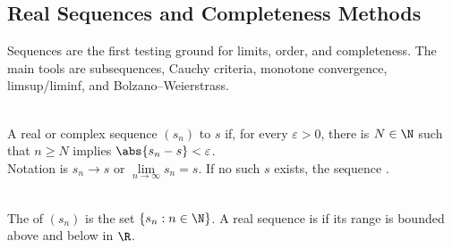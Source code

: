 \subsection{Real Sequences and Completeness Methods}

%

Sequences are the first testing ground for limits, order, and completeness. The main tools are subsequences, Cauchy criteria, monotone convergence, limsup/liminf, and Bolzano--Weierstrass.

\begin{definition} \label{def:real-complex-sequence-convergence} \\
A real or complex sequence $(s_n)$  to $s$ if, for every $\varepsilon>0$, there is $N\in\N$ such that $n\geq N$ implies $\abs{s_n-s}<\varepsilon$.\\
Notation is $s_n\to s$ or $\lim\limits_{n\to\infty}s_n=s$. If no such $s$ exists, the sequence .
\end{definition}

\begin{definition} \label{def:real-sequence-range-and-boundedness} \\
The  of $(s_n)$ is the set $\{s_n:n\in\N\}$. A real sequence is  if its range is bounded above and below in $\R$.
\end{definition}

